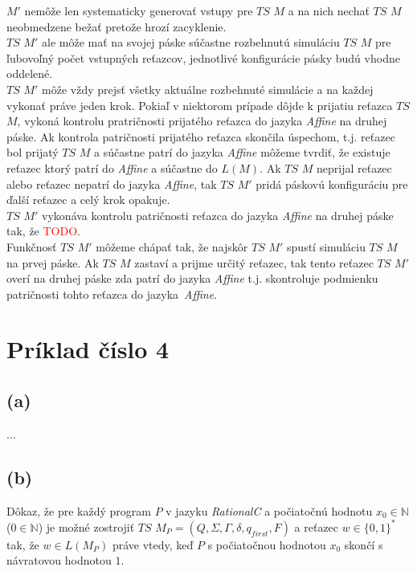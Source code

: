\documentclass[11pt,a4paper]{article}
\newcommand{\red}[1]{\textcolor{red}{#1}}
\begin{document}
$M'$ nemôže len systematicky generovať vstupy pre $TS$ $M$ a na nich nechať $TS$ $M$ neobmedzene bežať pretože hrozí zacyklenie.\\

$TS$ $M'$ ale môže mať na svojej páske súčastne rozbehnutú simuláciu $TS$ $M$ pre ľubovoľný počet vstupných reťazcov, jednotlivé konfigurácie pásky budú vhodne oddelené.\\

$TS$ $M'$ môže vždy prejsť všetky aktuálne rozbehnuté simulácie a na každej vykonať práve jeden krok.
Pokiaľ v niektorom prípade dôjde k prijatiu reťazca $TS$ $M$, vykoná kontrolu pratričnosti prijatého reťazca do jazyka \textit{Affine} na druhej páske. Ak kontrola patričnosti prijatého reťazca skončila úspechom, t.j. reťazec bol prijatý $TS$ $M$ a súčastne patrí do jazyka \textit{Affine} môžeme tvrdiť, že existuje reťazec ktorý patrí do \textit{Affine} a súčastne do $L(M)$. Ak $TS$ $M$ neprijal reťazec alebo reťazec nepatrí do jazyka \textit{Affine}, tak $TS$ $M'$ pridá páskovú konfiguráciu pre ďalší reťazec a celý krok opakuje.\\

$TS$ $M'$ vykonáva kontrolu patričnosti reťazca do jazyka \textit{Affine} na druhej páske tak, že \red{TODO}.\\

Funkčnosť $TS$ $M'$ môžeme chápať tak, že najskôr $TS$ $M'$ spustí simuláciu $TS$ $M$ na prvej páske. Ak $TS$ $M$ zastaví a prijme určitý reťazec, tak tento reťazec $TS$ $M'$ overí na druhej páske zda patrí do jazyka \textit{Affine} t.j. skontroluje podmienku patričnosti tohto reťazca do jazyka \textit{Affine}.

\newpage
\section{Príklad číslo 4} %

\subsection{(a)}
...

\newpage
\subsection{(b)}
Dôkaz, že pre každý program $P$ v jazyku \textit{RationalC} a počiatočnú hodnotu $x_0 \in \mathbb{N}$ ($0 \in \mathbb{N}$) je možné zostrojiť $TS$ $M_P = (Q, \Sigma, \Gamma, \delta, q_{first}, F)$ a reťazec $w \in \{0,1\}^*$ tak, že $w \in L(M_P)$ práve vtedy, keď $P$ s počiatočnou hodnotou $x_0$ skončí s návratovou hodnotou $1$.\\
\end{document}
